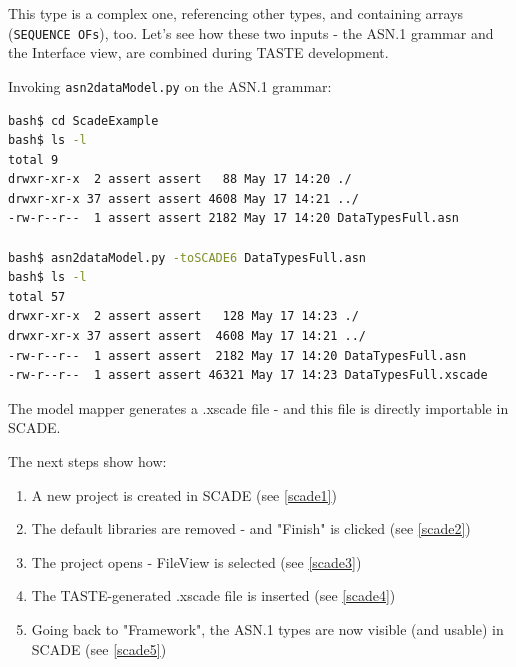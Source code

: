 \documentclass[11pt]{book}
\begin{document}
This type is a complex one, referencing other types, and containing arrays ({\tt SEQUENCE OFs}), too.
Let's see how these two inputs - the ASN.1 grammar and the Interface view, are combined during TASTE development.

Invoking {\tt asn2dataModel.py} on the ASN.1 grammar:

\begin{lstlisting}[language=bash]
bash$ cd ScadeExample
bash$ ls -l
total 9
drwxr-xr-x  2 assert assert   88 May 17 14:20 ./
drwxr-xr-x 37 assert assert 4608 May 17 14:21 ../
-rw-r--r--  1 assert assert 2182 May 17 14:20 DataTypesFull.asn

bash$ asn2dataModel.py -toSCADE6 DataTypesFull.asn
bash$ ls -l
total 57
drwxr-xr-x  2 assert assert   128 May 17 14:23 ./
drwxr-xr-x 37 assert assert  4608 May 17 14:21 ../
-rw-r--r--  1 assert assert  2182 May 17 14:20 DataTypesFull.asn
-rw-r--r--  1 assert assert 46321 May 17 14:23 DataTypesFull.xscade
\end{lstlisting}

The model mapper generates a .xscade file - and this file is directly importable in SCADE.

The next steps show how:
\begin{enumerate}
\item A new project is created in SCADE (see \ref{scade1})
\item The default libraries are removed - and "Finish" is clicked (see \ref{scade2})
\item The project opens - FileView is selected (see \ref{scade3})
\item The TASTE-generated .xscade file is inserted (see \ref{scade4})
\item Going back to "Framework", the ASN.1 types are now visible (and usable) in SCADE (see \ref{scade5})
\end{enumerate}
\end{document}
